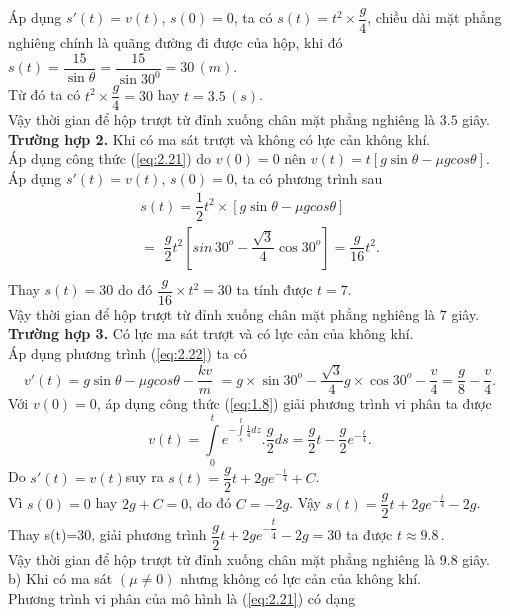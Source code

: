 Áp dụng $s'(t)=v(t)$, $s(0)=0$, ta có $s(t)={{t}^{2}}\times \dfrac{g}{4}$, chiều dài mặt phẳng nghiêng chính là quãng đường đi được của hộp, khi đó $s(t)=\dfrac{15}{\sin \theta }=\dfrac{15}{\sin {{30}^{0}}}=30\,(m)$.\\
Từ đó ta có ${{t}^{2}}\times\dfrac{g}{4}=30$ hay $t=3.5\,(s)$.\\
Vậy thời gian để hộp trượt từ đỉnh xuống chân mặt phẳng nghiêng là $3.5$ giây.\\
\textbf{Trường hợp 2.} Khi có ma sát trượt và không có lực cản không khí.\\
Áp dụng công thức (\ref{eq:2.21}) do $v(0)=0$ nên $v(t)=t[g\sin \theta -\mu gcos\theta ]$.   \\
Áp dụng $s'(t)=v(t)$, $s(0)=0$, ta có phương trình sau
$$\begin{array}{l}
s(t)=\dfrac{1}{2}{{t}^{2}}\times [g\sin \theta -\mu gcos\theta ]\\=\,\,\dfrac{g}{2}{{t}^{2}}[sin\,{{30}^{o}}-\dfrac{\sqrt{3}}{4}\cos {{30}^{o}}]=\dfrac{g}{16}{{t}^{2}}.\\
\end{array}$$
Thay $s(t)=30$ do đó $\dfrac{g}{16}\times{{t}^{2}}=30$ ta tính được $ t=7$.\\
Vậy thời gian để hộp trượt từ đỉnh xuống chân mặt phẳng nghiêng là $7$ giây.\\
\textbf{Trường hợp 3.}  Có lực ma sát trượt và có lực cản của không khí.\\
Áp dụng phương trình (\ref{eq:2.22}) ta có $$v'(t)=g\sin \theta -\mu gcos\theta -\dfrac{kv}{m}\,\,=g\times \sin {{30}^{o}}-\dfrac{\sqrt{3}}{4}g\times \cos {{30}^{o}}-\dfrac{v}{4}=\dfrac{g}{8}-\dfrac{v}{4}.$$
Với $v(0)=0$, áp dụng công thức (\ref{eq:1.8}) giải phương trình vi phân ta được 
$$v(t)=\int\limits_{0}^{t}{{{e}^{-\int\limits_{s}^{t}{\frac{1}{4}dz}}}.\dfrac{g}{2}ds}=\dfrac{g}{2}t-\dfrac{g}{2}{{e}^{-\frac{t}{4}}}.$$
Do $s'(t)=v(t)$suy ra $s(t)=\dfrac{g}{2}t+2g{{e}^{-\frac{t}{4}}}+C$. \\
Vì $s(0)=0 $ hay $2g+C=0$, do đó $C=-2g$. Vậy $s(t)=\dfrac{g}{2}t+2g{{e}^{-\frac{t}{4}}}-2g$.\\
Thay s(t)=30, giải phương trình $\dfrac{g}{2}t+2g{{e}^{-\dfrac{t}{4}}}-2g=30$ ta được $t\approx 9.8\,.$ \\
Vậy thời gian để hộp trượt từ đỉnh xuống chân mặt phẳng nghiêng là 9.8 giây.\\
b) Khi có ma sát $\left( \mu \ne 0 \right)$  nhưng không có lực cản của không khí.\\
Phương trình vi phân của mô hình là (\ref{eq:2.21}) có dạng
